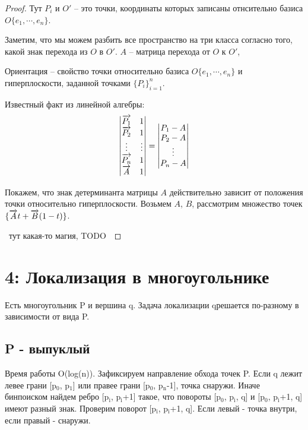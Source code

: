 \documentclass[11pt]{article}
\begin{document}
\begin{proof}
Тут $P_i$ и $O'$ -- это точки, координаты которых записаны отнсительно базиса
$O\{e_1,\cdots,e_n\}$.

Заметим, что мы можем разбить все пространство на три класса согласно того,
какой знак перехода из $O$ в $O'$. $A$ \--- матрица перехода от $O$ к $O'$,

Ориентация \--- свойство точки относительно базиса $O\{e_1,\cdots,e_n\}$ и
гиперплоскости, заданной точками $\{P_i\}_{i=1}^n$.

Известный факт из линейной алгебры:
\[
 \begin{vmatrix}
  \overrightarrow{P_1} & 1      \\
  \overrightarrow{P_2} & 1      \\
  \vdots     & \vdots \\
  \overrightarrow{P_n} & 1      \\
  \overrightarrow{A}   & 1
 \end{vmatrix}
=
 \begin{vmatrix}
  P_1 - A \\
  P_2 - A \\
  \vdots  \\
  P_n - A
 \end{vmatrix}
\]

Покажем, что знак детерминанта матрицы $A$ действительно зависит от положения
точки относительно гиперплоскости. Возьмем $A$, $B$, рассмотрим множество
точек $\{\overrightarrow{A}t + \overrightarrow{B}(1-t)\}$.

~тут какая-то магия, TODO~

\end{proof}
\section{{\bfseries{}} 4:  Локализация в многоугольнике}
\label{sec:orgheadline21}
Есть многоугольник P и вершина q. Задача локализации qрешается
по-разному в зависимости от вида P.
\subsection{P - выпуклый}
\label{sec:orgheadline19}
Время работы O(log(n)).  Зафиксируем направление обхода точек
P. Если q лежит левее грани [p\(_{\text{0}}\), p\(_{\text{1}}\)] или правее грани [p\(_{\text{0}}\),
p\(_{\text{n}}\)-1], точка снаружи. Иначе бинпоиском найдем ребро [p\(_{\text{i}}\), p\(_{\text{i}}\)+1]
такое, что повороты [p\(_{\text{0}}\), p\(_{\text{i}}\), q] и [p\(_{\text{0}}\), p\(_{\text{i}}\)+1, q] имеют разный
знак.  Проверим поворот [p\(_{\text{i}}\), p\(_{\text{i}}\)+1, q]. Если левый - точка внутри,
если правый - снаружи.
\end{document}
